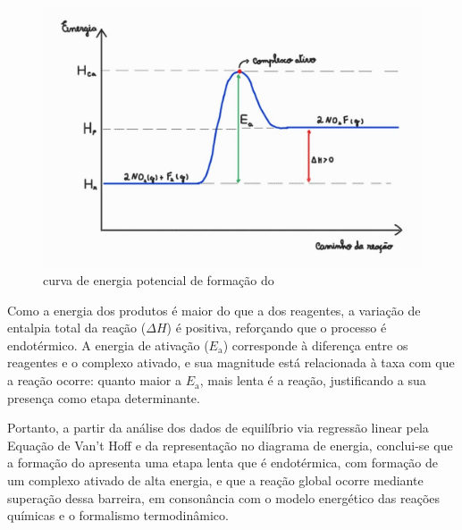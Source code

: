     \begin{figure}[H]
        \centering
        \includegraphics[width=0.6\linewidth]{fig/grafico.png}
        \caption{curva de energia potencial de formação do }
        \label{diagrama}
    \end{figure}

Como a energia dos produtos é maior do que a dos reagentes, a variação de entalpia total da reação (\(\Delta H\)) é positiva, reforçando que o processo é endotérmico. A energia de ativação (\(E_\text{a}\)) corresponde à diferença entre os reagentes e o complexo ativado, e sua magnitude está relacionada à taxa com que a reação ocorre: quanto maior a \(E_\text{a}\), mais lenta é a reação, justificando a sua presença como etapa determinante.

Portanto, a partir da análise dos dados de equilíbrio via regressão linear pela Equação de Van't Hoff e da representação no diagrama de energia, conclui-se que a formação do  apresenta uma etapa lenta que é endotérmica, com formação de um complexo ativado de alta energia, e que a reação global ocorre mediante superação dessa barreira, em consonância com o modelo energético das reações químicas e o formalismo termodinâmico.
